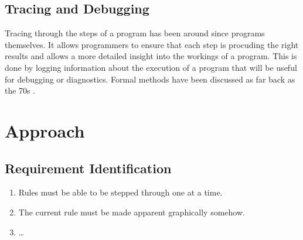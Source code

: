 \documentclass{UoYCSproject}
\begin{document}
\section{Tracing and Debugging}
Tracing through the steps of a program has been around since programs themselves. %
It allows programmers to ensure that each step is procuding the right results and allows a more detailed insight into the workings of a program. This is done by logging information about the execution of a program that will be useful for debugging or diagnostics. 
Formal methods have been discussed as far back as the 70s \cite{psych_debug, code_walkthroughs}. 





\chapter{Approach}
\section{Requirement Identification}
\begin{enumerate}
	\item Rules must be able to be stepped through one at a time.
 	\item The current rule must be made apparent graphically somehow.
	\item \ldots
\end{enumerate}
\end{document}
